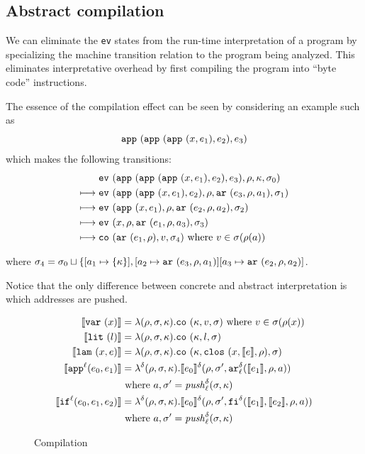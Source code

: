 \documentclass[preprint,onecolumn,9pt]{sigplanconf} %
\begin{document}

\subsection{Abstract compilation}

We can eliminate the {\tt ev} states from the run-time interpretation
of a program by specializing the machine transition relation to the
program being analyzed. This eliminates interpretative overhead by
first compiling the program into ``byte code'' instructions.

The essence of the compilation effect can be seen by considering an example
such as
\[
\sapp{\sapp{\sapp\mvar{\mexp_1}}{\mexp_2}}{\mexp_3}
\]
which makes the following transitions:
\begin{align}
& \ev{\sapp{\sapp{\sapp\mvar{\mexp_1}}{\mexp_2}}{\mexp_3},\menv,\mkont,\msto_0}\\
\machstep\; &
\ev{\sapp{\sapp\mvar{\mexp_1}}{\mexp_2},\menv,\kar{\mexp_3,\menv,\maddr_1},\msto_1}
\\
\machstep\; &
\ev{\sapp\mvar{\mexp_1},\menv,\kar{\mexp_2,\menv,\maddr_2},\msto_2}
\\
\machstep\; &
\ev{\mvar, \menv,\kar{\mexp_1,\menv,\maddr_3},\msto_3} %
\\
\machstep\; &
\co{\kar{\mexp_1,\menv},\mval,\msto_4} %
\mbox{ where } \mval \in \msto(\menv(\maddr))
\end{align}

where $\msto_4 = \msto_0 \sqcup \{ [\maddr_1 \mapsto \{ \mkont \}],
[\maddr_2 \mapsto \kar{\mexp_3,\menv,\maddr_1}]
[\maddr_3 \mapsto \kar{\mexp_2,\menv,\maddr_2}]$.

Notice that the only difference between concrete and abstract interpretation
is which addresses are pushed.

\begin{figure}
\begin{align*}
\compile{\svar\mvar} &= \lambda(\menv,\msto,\mkont) .\co{\mkont,\mval,\msto} \text{ where }\mval\in\msto(\menv(\mvar))
\\
\compile{\slit\mlit} &= \lambda(\menv,\msto,\mkont) .
\co{\mkont,\mlit,\msto}
\\
\compile{\slam\mvar\mexp} &= \lambda(\menv,\msto,\mkont) .
\co{\mkont,\clos{\mvar,\compile\mexp,\menv},\msto}
\\
\compile{\sapp[^\mlab]{\mexpi0}{\mexpi1}} &= \lambda^\mcntr(\menv,\msto,\mkont) .
\compile{\mexpi0}^\mcntr(\menv,\msto',\kar[_\mlab^\mcntr]{\compile{\mexpi1},\menv,\maddr})
\\
&
\text{ where }\maddr,\msto' = \mathit{push}^\mcntr_\mlab(\msto,\mkont)
\\
\compile{\sif[^\mlab]{\mexpi0}{\mexpi1}{\mexpi2}} &= \lambda^\mcntr(\menv,\msto,\mkont) .
\compile{\mexpi0}^\delta(\menv,\msto',\kif[^\mcntr]{\compile{\mexpi1},\compile{\mexpi2},\menv,\maddr})
\\
&\text{ where }\maddr,\msto' = \mathit{push}_\mlab^\mcntr(\msto,\mkont)
\end{align*}
\caption{Compilation}
\end{figure}
\end{document}
